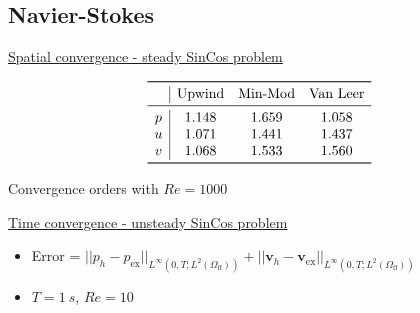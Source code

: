 \documentclass{beamer}
\begin{document}
\subsection*{Navier-Stokes}
\begin{frame}[label=spaceconv]{\hyperlink{spaceconvSupp}{Spatial convergence - 
steady SinCos problem}}
\vspace{-0.8cm}
\begin{figure}
	\centering
	\subfloat[\tiny Figure: Upwind, 
	$Re=1000$]{\hspace{-0.5cm}}
	\subfloat[\tiny Figure: Min-Mod, 
	$Re=1000$]{}
\end{figure}
\vspace{-0.3cm}
\begin{table}\footnotesize
	\[
	\begin{array}{c|ccc}
	\toprule
	& \text{Upwind} & \text{Min-Mod} & \text{Van Leer} \\ 
	\midrule
	p & 1.148 & 1.659 & 1.058\\
	u & 1.071 & 1.441 & 1.437\\
	v & 1.068 & 1.533 & 1.560\\
	\bottomrule
	\end{array}
	\]
	\caption{\tiny Convergence orders with $Re = 1000$}
\end{table}
\end{frame}
\begin{frame}[label=timeconv]{\hyperlink{timeconvSupp}{Time convergence - 
unsteady SinCos problem}}
\begin{figure}
	\centering
	
\end{figure}
\vspace{-0.3cm}
\begin{itemize}
\item Error = $|\!|p_h - p_\text{ex}|\!|_{L^\infty(0,T;L^2(\Omega_\text{ff}))} 
+ |\!|\mathbf{v}_h - 
\mathbf{v}_\text{ex}|\!|_{L^\infty(0,T;L^2(\Omega_\text{ff}))}$
\item $T = \SI{1}{s}$, $Re=10$
\end{itemize}
\end{frame}
\end{document}
